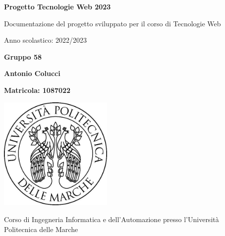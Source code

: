 \documentclass[12pt,a4paperS]{report}
\begin{document}
	\begin{titlepage}
		\begin{center}
			
			\Large
			\textbf{Progetto Tecnologie Web 2023}
			
			\vspace{0.5cm}
			
			Documentazione del progetto sviluppato per il corso di Tecnologie Web
			
			\vspace{0.5cm}
			
			Anno scolastico: 2022/2023
			
			\vspace{1.5cm}
			
			\textbf{Gruppo 58}
			
			\vspace{0.5cm}
			
			\textbf{Antonio Colucci}
			
			\vspace{0.5cm}
			
			\textbf{Matricola: 1087022}
			
			\vspace{2cm}
			
			\includegraphics[width=5.5cm]{logo_uni}
			
			\vspace{1.5cm}
			
			\Large
			Corso di Ingegneria Informatica e dell'Automazione presso l'Università Politecnica delle Marche
		\end{center}
	\end{titlepage}
	\tableofcontents
	\newpage
	
\end{document}
